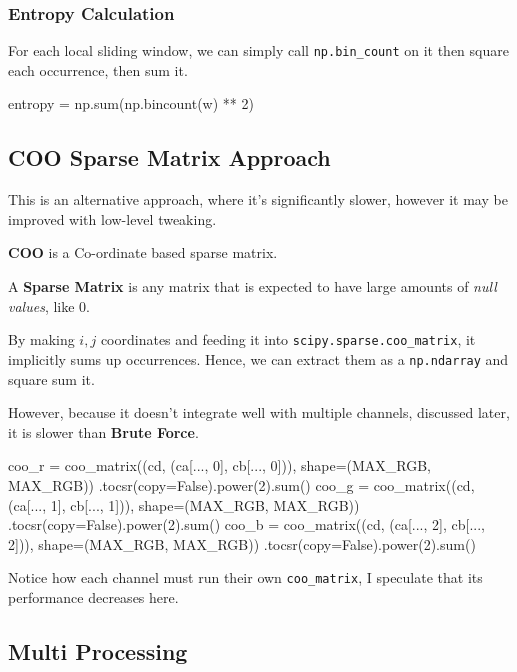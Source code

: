\documentclass[article,oneside]{memoir}
\begin{document}
\subsubsection{Entropy Calculation}

For each local sliding window, we can simply call \verb+np.bin_count+ on it then square each occurrence, then sum it.

\begin{python}
entropy = np.sum(np.bincount(w) ** 2)
\end{python}

\subsection{COO Sparse Matrix Approach}

This is an alternative approach, where it's significantly slower, however it may be improved with low-level tweaking.

\textbf{COO} is a Co-ordinate based sparse matrix.

A \textbf{Sparse Matrix} is any matrix that is expected to have large amounts of \textit{null values}, like 0.

By making $i, j$ coordinates and feeding it into \verb+scipy.sparse.coo_matrix+, it implicitly sums up occurrences. Hence, we can extract them as a \verb+np.ndarray+ and square sum it.

However, because it doesn't integrate well with multiple channels, discussed later, it is slower than \textbf{Brute Force}.

\begin{python}
    
coo_r = coo_matrix((cd, (ca[..., 0], cb[..., 0])),
                    shape=(MAX_RGB, MAX_RGB))
                    .tocsr(copy=False).power(2).sum()
coo_g = coo_matrix((cd, (ca[..., 1], cb[..., 1])),
                    shape=(MAX_RGB, MAX_RGB))
                    .tocsr(copy=False).power(2).sum()
coo_b = coo_matrix((cd, (ca[..., 2], cb[..., 2])),
                    shape=(MAX_RGB, MAX_RGB))
                    .tocsr(copy=False).power(2).sum()
    
\end{python}

Notice how each channel must run their own \verb+coo_matrix+, I speculate that its performance decreases here.

\subsection{Multi Processing}
\end{document}
